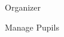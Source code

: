 
\begin{section}{Organizer}

    \begin{subsection}{Manage Pupils}
    
    \end{subsection}

\end{section}

